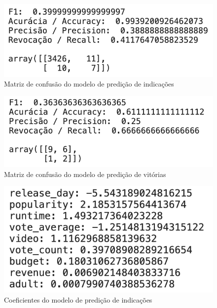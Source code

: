         \begin{figure}[htb]
        	\caption{\label{confusao_1}Matriz de confusão do modelo de predição de indicações}
        	\begin{center}
        		\includegraphics[scale=0.7]{confusao_1.png}
        	\end{center}
        \end{figure}
        
        \begin{figure}[htb]
        	\caption{\label{confusao_2}Matriz de confusão do modelo de predição de vitórias}
        	\begin{center}
        		\includegraphics[scale=0.7]{confusao_2.png}
        	\end{center}
        \end{figure}
        
        \begin{figure}[htb]
        	\caption{\label{coefs_1}Coeficientes do modelo de predição de indicações}
        	\begin{center}
        		\includegraphics[scale=0.7]{coefs_1.png}
        	\end{center}
        \end{figure}
        
